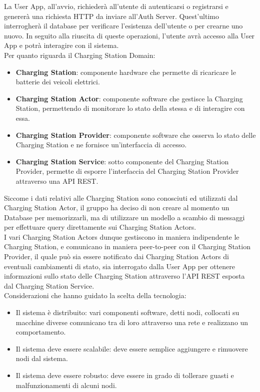 La User App, all'avvio, richiederà all'utente di autenticarsi o registrarsi e genererà una richiesta HTTP da inviare all'Auth Server. Quest'ultimo interrogherà il database per verificare l'esistenza
dell'utente o per crearne uno nuovo. In seguito alla riuscita di queste operazioni, l'utente avrà accesso alla User App e potrà interagire con il sistema.\\

Per quanto riguarda il Charging Station Domain:
\begin{itemize}
    \item \textbf{Charging Station}: componente hardware che permette di ricaricare le batterie dei veicoli elettrici.
    \item \textbf{Charging Station Actor}: componente software che gestisce la Charging Station, permettendo di monitorare lo stato della stessa e di interagire con essa.
    \item \textbf{Charging Station Provider}: componente software che osserva lo stato delle Charging Station e ne fornisce un'interfaccia di accesso.
    \item \textbf{Charging Station Service}: sotto componente del Charging Station Provider, permette di esporre l'interfaccia del Charging Station Provider attraverso una API REST. \\
\end{itemize}

Siccome i dati relativi alle Charging Station sono conosciuti ed utilizzati dal Charging Station Actor, il gruppo ha deciso di non creare al momento un Database per memorizzarli, ma di utilizzare un modello a scambio di messaggi per effettuare
query direttamente sui Charging Station Actors.\\

I vari Charging Station Actors dunque gestiscono in maniera indipendente le Charging Station, e comunicano in maniera peer-to-peer con il Charging Station Provider, il quale può sia essere notificato
dai Charging Station Actors di eventuali cambiamenti di stato, sia interrogato dalla User App per ottenere informazioni sullo stato delle Charging Station attraverso l'API REST esposta dal Charging Station Service.\\



Considerazioni che hanno guidato la scelta della tecnologia:
\begin{itemize}
    \item Il sistema è distribuito: vari componenti software, detti nodi, collocati su macchine diverse comunicano tra di loro attraverso una rete e realizzano un comportamento.
    \item Il sistema deve essere scalabile: deve essere semplice aggiungere e rimuovere nodi dal sistema.
    \item Il sistema deve essere robusto: deve essere in grado di tollerare guasti e malfunzionamenti di alcuni nodi.
\end{itemize}

